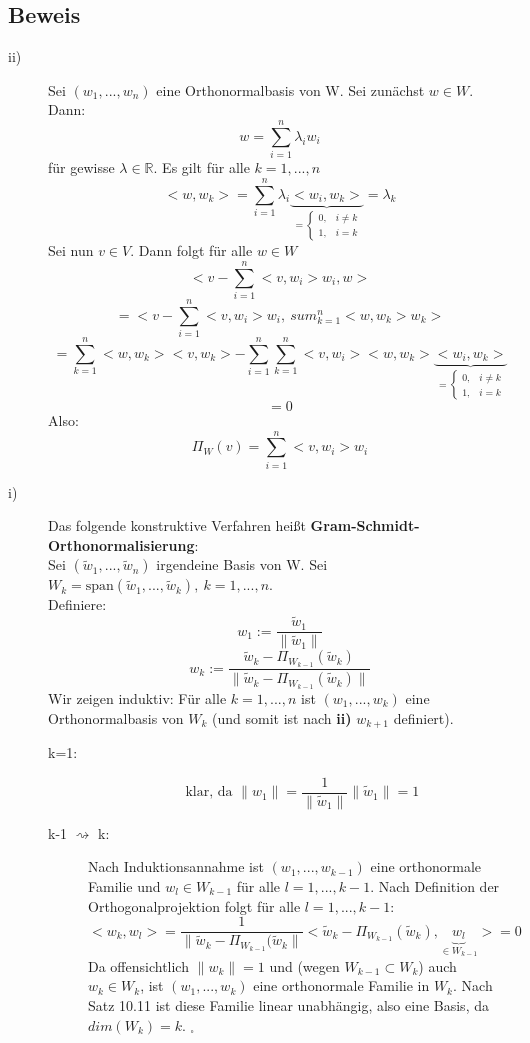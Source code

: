 \documentclass{scrbook}
\begin{document}
\subsection*{Beweis}
\begin{description}
\item[ii)] Sei $(w_1,...,w_n)$ eine Orthonormalbasis von W. Sei zunächst $w \in W$. Dann:
\[w= \sum^n_{i=1} \lambda_i w_i\]
für gewisse $\lambda \in \mathbb{R}$. Es gilt für alle $k = 1,...,n$
\[<w,w_k> = \sum^n_{i=1}\lambda_i \underbrace{<w_i,w_k>}_{=\left\{
\begin{array}{cl}
0,& i\neq k\\
1,& i=k 
\end{array}
\right.} = \lambda_k\]
Sei nun $v\in V$. Dann folgt für alle $w \in W$
\[
<v-\sum^n_{i=1}<v,w_i>w_i,w>
\]
\[
=<v-\sum^n_{i=1}<v,w_i> w_i,\ sum^n_{k=1} <w,w_k>w_k>
\]
\[
=\sum^n_{k=1}<w,w_k><v,w_k>-\sum^n_{i=1}\sum^n_{k=1}<v,w_i><w,w_k>\underbrace{<w_i,w_k>}_{=\left\{
\begin{array}{cl}
0,& i\neq k\\
1,& i=k 
\end{array}
\right.}\]
\[=0\]
Also: \[\Pi_W(v) = \sum^n_{i=1}<v,w_i>w_i\]
\item[i)] Das folgende konstruktive Verfahren heißt \textbf{Gram-Schmidt-Orthonormalisierung}:\\
Sei $(\tilde{w}_1,...,\tilde{w}_n)$ irgendeine Basis von W. Sei $W_k = \text{span}(\tilde{w}_1,...,\tilde{w}_k),\ k=1,...,n$.\\
Definiere:
\[w_1 := \frac{\tilde{w}_1}{\|\tilde{w}_1\|}\]
\[w_k := \frac{\tilde{w}_k - \Pi_{W_{k-1}} (\tilde{w}_k)}{\|\tilde{w}_k - \Pi_{W_{k-1}}(\tilde{w}_k)\|}\]
Wir zeigen induktiv: Für alle $k=1,...,n$ ist $(w_1,...,w_k)$ eine Orthonormalbasis von $W_k$ (und somit ist nach \textbf{ii)} $w_{k+1}$ definiert).
\begin{description}
\item[k=1:] \[ \text{ klar, da } \|w_1\| = \frac{1}{\|\tilde{w}_1\|}\|\tilde{w}_1\|=1\]
\item[k-1 $\rightsquigarrow$ k:] Nach Induktionsannahme ist $(w_1,...,w_{k-1})$ eine orthonormale Familie und $w_l \in W_{k-1}$ für alle $l=1,...,k-1$. Nach Definition der Orthogonalprojektion folgt für alle $l=1,...,k-1$:
\[<w_k,w_l> = \frac{1}{\|\tilde{w}_k-\Pi_{W_{k-1}}(\tilde{w}_k\|} <\tilde{w}_k - \Pi_{W_{k-1}}(\tilde{w}_k)  ,\underbrace{w_l}_{\in W_{k-1}}> =0 \]
Da offensichtlich $\|w_k\| = 1$ und (wegen $W_{k-1} \subset W_k$) auch $w_k \in W_k$, ist $(w_1,...,w_k)$ eine orthonormale Familie in $W_k$. Nach Satz 10.11 ist diese Familie linear unabhängig, also eine Basis, da $dim(W_k)=k$. $_\square$
\end{description}
\end{description}
\end{document}
